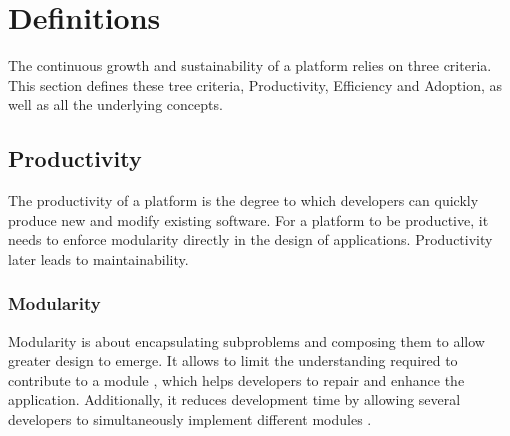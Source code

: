\section{Definitions} \label{chapter3:definitions}

The continuous growth and sustainability of a platform relies on three criteria.
This section defines these tree criteria, Productivity, Efficiency and Adoption, as well as all the underlying concepts.



\subsection{Productivity} \label{chapter3:definitions:productivity}

The productivity of a platform is the degree to which developers can quickly produce new and modify existing software.
For a platform to be productive, it needs to enforce modularity directly in the design of applications.
Productivity later leads to maintainability.

\subsubsection{Modularity} \label{chapter3:definitions:productivity:modularity}

Modularity is about encapsulating subproblems and composing them to allow greater design to emerge.
It allows to limit the understanding required to contribute to a module \cite{Stevens1974}, which helps developers to repair and enhance the application. 
Additionally, it reduces development time by allowing several developers to simultaneously implement different modules \cite{Wong2009,Cataldo2006}.

